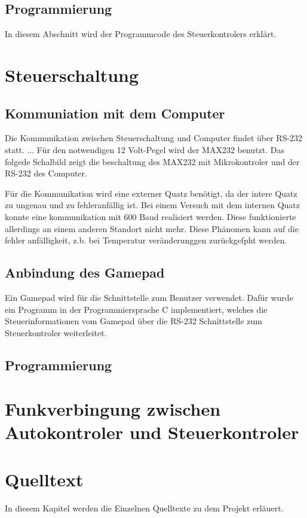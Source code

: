 \documentclass{scrartcl}
\begin{document}
	
	\subsection{Programmierung} %
		In diesem Abschnitt wird der Programmcode des Steuerkontrolers erklärt.

\section{Steuerschaltung}

	\subsection{Kommuniation mit dem Computer} %
		Die Kommunikation zwischen Steuerschaltung und Computer findet über RS-232 statt.
		...
		Für den notwendigen 12 Volt-Pegel wird der MAX232 benutzt.
		Das folgede Schalbild zeigt die beschaltung des MAX232 mit Mikrokontroler und der RS-232 des Computer.

		Für die Kommunikation wird eine externer Quatz benötigt, da der intere Quatz zu ungenau und zu fehleranfällig ist.
		Bei einem Versuch mit dem internen Quatz konnte eine kommunikation mit 600 Baud realisiert werden.
		Diese funktionierte allerdings an einem anderen Standort nicht mehr. Diese Phänomen kann auf die fehler anfälligkeit,
		z.b. bei Temperatur veränderunggen zurückgefpht werden.

	\subsection{Anbindung des Gamepad} %
		Ein Gamepad wird für die Schnittstelle zum Benutzer verwendet.
		Dafür wurde ein Programm in der Programmiersprache C implementiert,
		welches die Steuerinformationen vom Gamepad über die RS-232 Schnittstelle zum Steuerkontroler weiterleitet.
	
	\subsection{Programmierung} %

\section{Funkverbingung zwischen Autokontroler und Steuerkontroler} %

\section{Quelltext} %
	In diesem Kapitel werden die Einzelnen Quelltexte zu dem Projekt erläuert.
\end{document}
